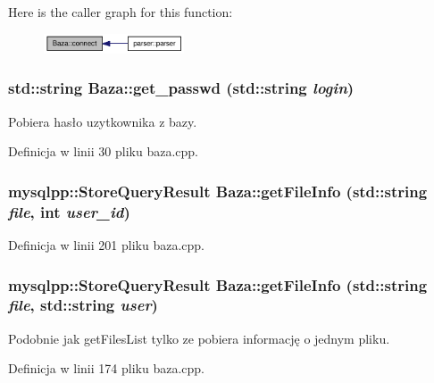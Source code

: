 Here is the caller graph for this function:\nopagebreak
\begin{figure}[H]
\begin{center}
\leavevmode
\includegraphics[width=118pt]{a00001_bef61cc396e46d347a47c75e9ef8dfde_icgraph}
\end{center}
\end{figure}
\hypertarget{a00001_a09b37e4665bd7b2f2b8b54f8120f5be}{
\subsubsection[{get\_\-passwd}]{\setlength{\rightskip}{0pt plus 5cm}std::string Baza::get\_\-passwd (std::string {\em login})}}
\label{a00001_a09b37e4665bd7b2f2b8b54f8120f5be}


Pobiera hasło uzytkownika z bazy. 



Definicja w linii 30 pliku baza.cpp.\hypertarget{a00001_1d1cfca062ab3117b2b97281df012823}{
\subsubsection[{getFileInfo}]{\setlength{\rightskip}{0pt plus 5cm}mysqlpp::StoreQueryResult Baza::getFileInfo (std::string {\em file}, \/  int {\em user\_\-id})}}
\label{a00001_1d1cfca062ab3117b2b97281df012823}




Definicja w linii 201 pliku baza.cpp.\hypertarget{a00001_e4a033a65cb585aa91c15fd8b8fde764}{
\subsubsection[{getFileInfo}]{\setlength{\rightskip}{0pt plus 5cm}mysqlpp::StoreQueryResult Baza::getFileInfo (std::string {\em file}, \/  std::string {\em user})}}
\label{a00001_e4a033a65cb585aa91c15fd8b8fde764}


Podobnie jak getFilesList tylko ze pobiera informację o jednym pliku. 



Definicja w linii 174 pliku baza.cpp.


